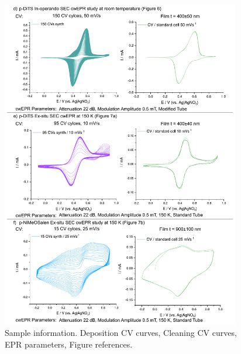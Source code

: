 \begin{figure}[]
\centering
\includegraphics[width=0.93\textwidth]{./electrochemistry/figures/Figure_S3b}
\caption{Sample information. Deposition CV curves, Cleaning CV curves, EPR parameters, Figure references.}
\label{fig:S3}
\end{figure}

\newpage
